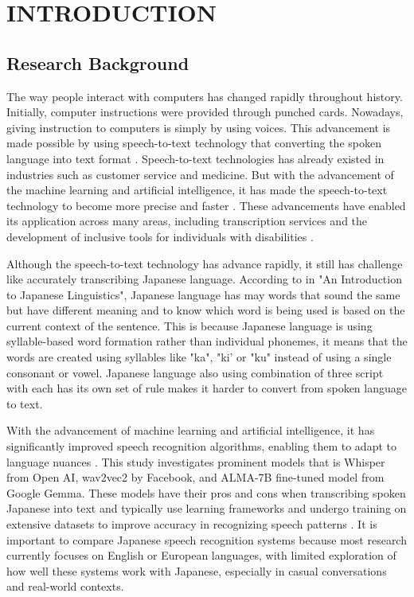 \chapter{INTRODUCTION}
\label{ch:intro}

\section{Research Background}
\label{sec:intro-bg}

The way people interact with computers has changed rapidly throughout history. Initially, computer instructions were provided through punched cards. Nowadays, giving instruction to computers is simply by using voices. This advancement is made possible by using speech-to-text technology that converting the spoken language into text format \parencite{Xu}. Speech-to-text technologies has already existed in industries such as customer service and medicine. But with the advancement of the machine learning and artificial intelligence, it has made the speech-to-text technology to become more precise and faster \parencite{latif2020}. These advancements have enabled its application across many areas, including transcription services and the development of inclusive tools for individuals with disabilities \parencite{Koenecke2020}.

Although the speech-to-text technology has advance rapidly, it still has challenge like accurately transcribing Japanese language. According to \textcite{Kanno} in "An Introduction to Japanese Linguistics", Japanese language has may words that sound the same but have different meaning and to know which word is being used is based on the current context of the sentence. This is because Japanese language is using syllable-based word formation rather than individual phonemes, it means that the words are created using syllables like "ka", "ki' or "ku" instead of using a single consonant or vowel. Japanese language also using combination of three script with each has its own set of rule makes it harder to convert from spoken language to text. 

With the advancement of machine learning and artificial intelligence, it has significantly improved speech recognition algorithms, enabling them to adapt to language nuances \parencite{xu2023recent}. This study investigates prominent models that is Whisper from Open AI, wav2vec2 by Facebook, and ALMA-7B fine-tuned model from Google Gemma. These models have their pros and cons when transcribing spoken Japanese into text and typically use learning frameworks and undergo training on extensive datasets to improve accuracy in recognizing speech patterns \parencite{ando2021}. It is important to compare Japanese speech recognition systems because most research currently focuses on English or European languages, with limited exploration of how well these systems work with Japanese, especially in casual conversations and real-world contexts.


